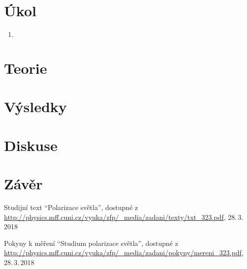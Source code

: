 \documentclass{protokol}
\begin{document}
  \section*{Úkol}

    \begin{enumerate}
      \item 
    \end{enumerate}

  \section*{Teorie}

  \section*{Výsledky}

  \section*{Diskuse}

  \section*{Závěr}
      
  \begin{thebibliography}{}
 
    Studijní text ``Polarizace světla'', dostupné z\\ \url{http://physics.mff.cuni.cz/vyuka/zfp/_media/zadani/texty/txt_323.pdf}, 28.\,3.\,2018

    Pokyny k měření ``Studium polarizace světla'', dostupné z\\ \url{http://physics.mff.cuni.cz/vyuka/zfp/_media/zadani/pokyny/mereni_323.pdf}, 28.\,3.\,2018
   
  \end{thebibliography}
\end{document}
